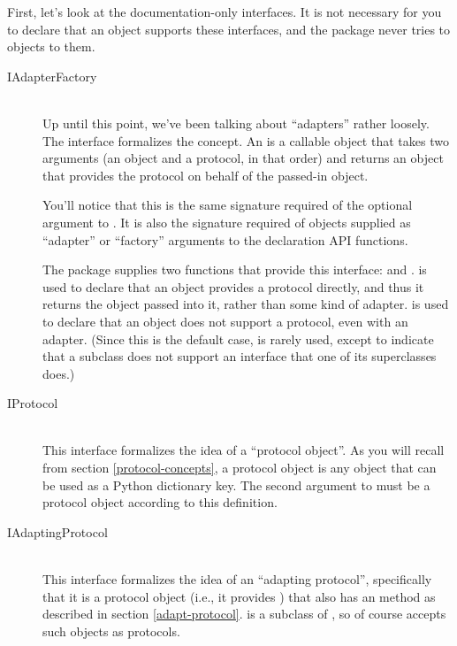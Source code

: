 \begin{verbatim%
}
\begin{verbatim%
}
\begin{verbatim%
}
\begin{verbatim%
}
\begin{verbatim%
}
\begin{verbatim%
}
First, let's look at the documentation-only interfaces.  It is not necessary
for you to declare that an object supports these interfaces, and the
 package never tries to  objects to them.

\begin{description}

\item[IAdapterFactory] \hfill \\
Up until this point, we've been talking about ``adapters'' rather loosely.  The
 interface formalizes the concept.  An  is a callable object that takes two arguments (an object and a
protocol, in that order) and returns an object that provides the protocol on
behalf of the passed-in object.

You'll notice that this is the same signature required of the optional
 argument to .  It is also the signature required
of objects supplied as ``adapter'' or ``factory'' arguments to the declaration
API functions.

The  package supplies two functions that provide
this interface:  and .
 is used to declare that an object provides a
protocol directly, and thus it returns the object passed into it, rather than
some kind of adapter.   is used to declare that an
object does not support a protocol, even with an adapter.  (Since this is the
default case,  is rarely used, except to indicate
that a subclass does not support an interface that one of its superclasses
does.)

\item[IProtocol] \hfill \\
This interface formalizes the idea of a ``protocol object''.  As you will
recall from section \ref{protocol-concepts}, a protocol object is any object
that can be used as a Python dictionary key.  The second argument to
 must be a protocol object according to this definition.


\item[IAdaptingProtocol] \hfill \\
This interface formalizes the idea of an ``adapting protocol'', specifically
that it is a protocol object (i.e., it provides ) that also
has an  method as described in section \ref{adapt-protocol}.
 is a subclass of , so of course
 accepts such objects as protocols.


\end{description}
\end{verbatim%
}
\end{verbatim%
}
\end{verbatim%
}
\end{verbatim%
}
\end{verbatim%
}
\end{verbatim%
}
